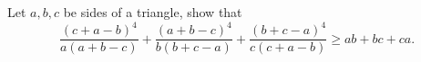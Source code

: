 Let $a,b,c$ be sides of a triangle, show that
\[\frac{(c+a-b)^{4}}{a(a+b-c)}+\frac{(a+b-c)^{4}}{b(b+c-a)}+\frac{(b+c-a)^{4}}{c(c+a-b)}\geq ab+bc+ca.\]